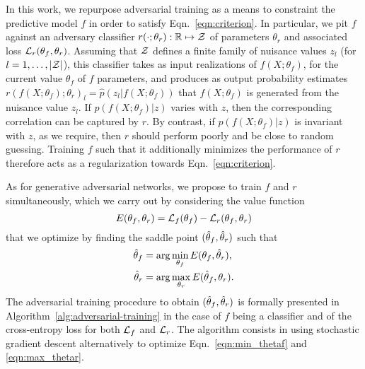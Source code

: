 \documentclass{article}
\theoremstyle{plain}
\begin{document}
In this work, we repurpose adversarial training as a means to constraint the
predictive model $f$ in order to satisfy Eqn.~\ref{eqn:criterion}. In
particular, we pit $f$ against an adversary classifier $r(\cdot ;
\theta_r) : \mathbb{R} \mapsto {\cal Z}$ of parameters $\theta_r$ and
associated loss ${\cal L}_r(\theta_f, \theta_r)$.
Assuming that ${\cal Z}$ defines a finite family of nuisance values $z_l$ (for $l=1, \dots, |{\cal Z}|$),
this classifier takes as input realizations of $f(X; \theta_f)$, for the current value $\theta_f$ of $f$ parameters,
and produces as output probability estimates $r(f(X; \theta_f); \theta_r)_l = \hat{p}(z_l| f(X; \theta_f)) $
that $f(X; \theta_f)$ is generated from the nuisance value $z_l$. If $p(f(X; \theta_f)|z)$ varies with $z$,
then the corresponding correlation can be captured by $r$. By contrast, if
$p(f(X; \theta_f)|z)$ is invariant with $z$, as we require, then $r$
should perform poorly and be close to random guessing. Training $f$ such that it additionally minimizes the performance of $r$
therefore acts as a regularization towards Eqn.~\ref{eqn:criterion}.

As for generative adversarial networks, we propose to
train $f$ and $r$ simultaneously, which we carry out by considering
the value function
\begin{equation}
    E(\theta_f, \theta_r) = {\cal L}_f(\theta_f) - {\cal L}_r(\theta_f, \theta_r)
\end{equation}
that we optimize by finding the saddle point $(\smash{\hat\theta_f}, \smash{\hat\theta_r})$ such that
\begin{align}
    \smash{\hat\theta_f} &= \arg \min_{\theta_f} E(\theta_f, \smash{\hat\theta_r}), \label{eqn:min_thetaf} \\
    \smash{\hat\theta_r} &= \arg \max_{\theta_r} E(\smash{\hat\theta_f}, \theta_r) \label{eqn:max_thetar}.
\end{align}
The adversarial training procedure to obtain $(\smash{\hat\theta_f},
\smash{\hat\theta_r})$ is formally presented in
Algorithm~\ref{alg:adversarial-training} in the case of $f$ being a classifier
and of the cross-entropy loss for both ${\cal L}_f$ and ${\cal L}_r$. The algorithm
consists in using stochastic gradient descent alternatively to optimize
Eqn.~\ref{eqn:min_thetaf} and \ref{eqn:max_thetar}.
\end{document}
